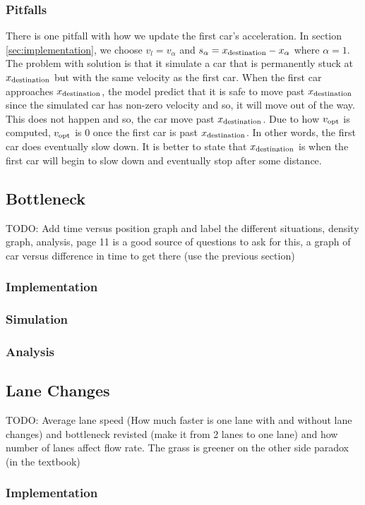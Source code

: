 \documentclass[12pt]{article}
\begin{document}
    \subsubsection{Pitfalls}\label{sec:homogeneous_pitfal}
    There is one pitfall with how we update the first car's acceleration. In section \ref{sec:implementation}, we choose $v_l = v_\alpha$ and $s_\alpha = x_{\rm destination} - x_\alpha$ where $\alpha = 1$. The problem with solution is that it simulate a car that is permanently stuck at $x_{\rm destination}$ but with the same velocity as the first car. When the first car approaches $x_{\rm destination}$, the model predict that it is safe to move past $x_{\rm destination}$ since the simulated car has non-zero velocity and so, it will move out of the way. This does not happen and so, the car move past $x_{\rm destination}$. Due to how $v_{\rm opt}$ is computed, $v_{\rm opt}$ is $0$ once the first car is past $x_{\rm destination}$. In other words, the first car does eventually slow down. It is better to state that $x_{\rm destination}$ is when the first car will begin to slow down and eventually stop after some distance.  
    \subsection{Bottleneck}
    TODO: Add time versus position graph and label the different situations, density graph, analysis, page 11 is a good source of questions to ask for this, a graph of car versus difference in time to get there (use the previous section)
    \subsubsection{Implementation}
    \subsubsection{Simulation}
    \subsubsection{Analysis}
    \subsection{Lane Changes}
    TODO: Average lane speed (How much faster is one lane with and without lane changes) and bottleneck revisted (make it from 2 lanes to one lane) and how number of lanes affect flow rate. The grass is greener on the other side paradox (in the textbook) 
    \subsubsection{Implementation}
\end{document}

